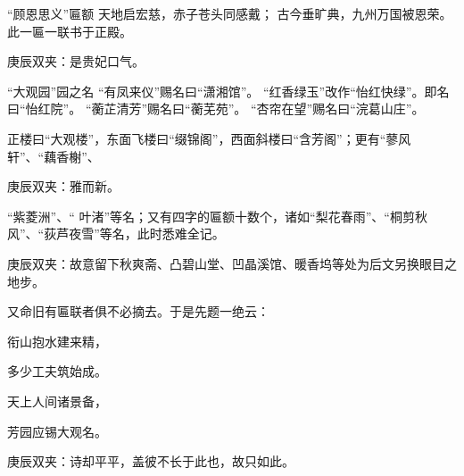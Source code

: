 \begin{qute}
    \begin{parag}
        “顾恩思义”匾额\newline
        天地启宏慈，赤子苍头同感戴；\newline
        古今垂旷典，九州万国被恩荣。\newline
        此一匾一联书于正殿。\begin{note}庚辰双夹：是贵妃口气。\end{note}
    \end{parag}

    \begin{parag}
        “大观园”园之名\newline
        “有凤来仪”赐名曰“潇湘馆”。 \newline
        “红香绿玉”改作“怡红快绿”。即名曰“怡红院”。\newline
        “蘅芷清芳”赐名曰“蘅芜苑”。 \newline
        “杏帘在望”赐名曰“浣葛山庄”。 \newline
    \end{parag}
\end{qute}


\begin{parag}
    正楼曰“大观楼”，东面飞楼曰“缀锦阁”，西面斜楼曰“含芳阁”；更有“蓼风轩”、“藕香榭”、\begin{note}庚辰双夹：雅而新。\end{note}“紫菱洲”、“ 叶渚”等名；又有四字的匾额十数个，诸如“梨花春雨”、“桐剪秋风”、“荻芦夜雪”等名，此时悉难全记。\begin{note}庚辰双夹：故意留下秋爽斋、凸碧山堂、凹晶溪馆、暖香坞等处为后文另换眼目之地步。\end{note}又命旧有匾联者俱不必摘去。于是先题一绝云：
\end{parag}


\begin{poem}
    \begin{pl}衔山抱水建来精，\end{pl}

    \begin{pl}多少工夫筑始成。\end{pl}

    \begin{pl}天上人间诸景备，\end{pl}

    \begin{pl}芳园应锡大观名。\end{pl}
    \begin{note}庚辰双夹：诗却平平，盖彼不长于此也，故只如此。\end{note}
\end{poem}


